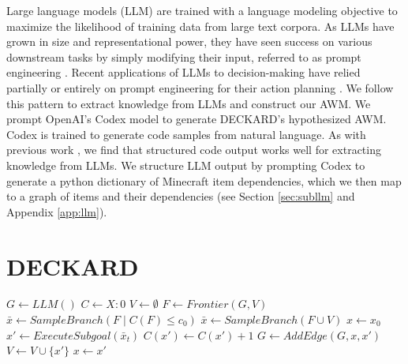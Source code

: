 \documentclass[nohyperref]{article}
\theoremstyle{plain}
\theoremstyle{definition}
\theoremstyle{remark}
\newcommand{\agentshort}{\textsc{DECKARD}}
\begin{document}
Large language models (LLM) are trained with a language modeling objective to maximize the likelihood of training data from large text corpora. 
As LLMs have grown in size and representational power, they have seen success on various downstream tasks by simply modifying their input, referred to as prompt engineering \cite{brown2020language}. 
Recent applications of LLMs to decision-making have relied partially or entirely on prompt engineering for their action planning \cite{ichter2022do,song2022llm,huanginner,singhprogprompt,liang2022code}.
We follow this pattern to extract knowledge from LLMs and construct our AWM.
We prompt OpenAI's Codex model \cite{OpenAICodex} to generate \agentshort{}'s hypothesized AWM.
Codex is trained to generate code samples from natural language.
As with previous work \cite{singhprogprompt,liang2022code}, we find that structured code output works well for extracting knowledge from LLMs.
We structure LLM output by prompting Codex to generate a python dictionary of Minecraft item dependencies, which we then map to a graph of items and their dependencies (see Section \ref{sec:subllm} and Appendix \ref{app:llm}).

\section{DECKARD}
\label{sec:deckard}

\begin{algorithm}[t]
\caption{\agentshort}\label{alg:deckard}
\begin{algorithmic}
    \STATE $G \gets LLM()$ \hfill{}
    \STATE $C \gets X: 0$ \hfill{}
    \STATE $V \gets \emptyset$ \hfill{}
        \STATE{}
        \STATE $F \gets Frontier(G, V)$
            \STATE $\bar{x} \gets SampleBranch(F\;|\;C(F)\le c_0)$
        \ELSE
            \STATE $\bar{x} \gets SampleBranch(F\cup V)$
        \ENDIF
        \STATE{}
        \STATE $x \gets x_0$
            \STATE $x' \gets ExecuteSubgoal(\bar{x}_t)$
            \STATE $C(x') \gets C(x')+1$
                \STATE $G \gets AddEdge(G, x, x')$
                \STATE $V \gets V \cup \{x'\}$
            \ENDIF
            \STATE $x \gets x'$
        \ENDFOR
    \ENDWHILE
\end{algorithmic}
\end{algorithm}
\end{document}
